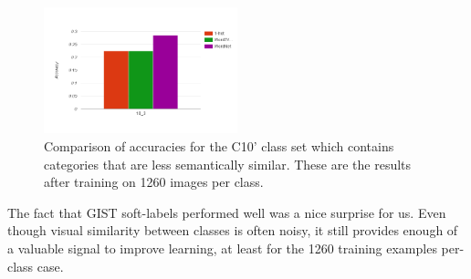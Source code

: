 \begin{figure}[!tb]
  \centering
  \includegraphics[width=0.5\textwidth]{figs/10_3-train_1260.png}
  \caption{
      Comparison of accuracies for the C10' class set which contains categories
      that are less semantically similar. These are the results after training
      on 1260 images per class.
  }
  \label{fig:10_3-train_1260}
\end{figure}

The fact that GIST soft-labels performed well was a nice surprise for us. Even
though visual similarity between classes is often noisy, it still provides
enough of a valuable signal to improve learning, at least for the 1260 training
examples per-class case.





